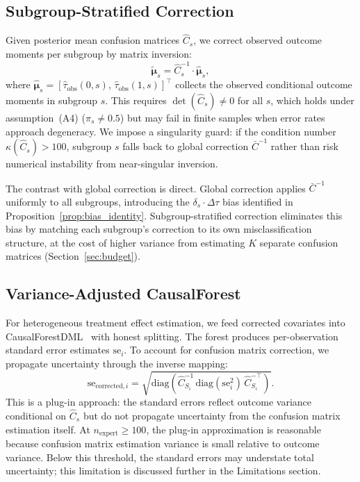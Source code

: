\subsection{Subgroup-Stratified Correction}

Given posterior mean confusion matrices $\hat{C}_s$, we correct observed outcome moments per subgroup by matrix inversion:
\begin{equation}
\tilde{\boldsymbol{\mu}}_s = \hat{C}_s^{-1} \cdot \hat{\boldsymbol{\mu}}_s,
\end{equation}
where $\hat{\boldsymbol{\mu}}_s = [\hat{\tau}_{\text{obs}}(0, s),\, \hat{\tau}_{\text{obs}}(1, s)]^\top$ collects the observed conditional outcome moments in subgroup $s$.
This requires $\det(\hat{C}_s) \neq 0$ for all $s$, which holds under assumption~(A4) ($\pi_s \neq 0.5$) but may fail in finite samples when error rates approach degeneracy.
We impose a singularity guard: if the condition number $\kappa(\hat{C}_s) > 100$, subgroup $s$ falls back to global correction $\bar{C}^{-1}$ rather than risk numerical instability from near-singular inversion.

The contrast with global correction is direct.
Global correction applies $\bar{C}^{-1}$ uniformly to all subgroups, introducing the $\delta_s \cdot \Delta\tau$ bias identified in Proposition~\ref{prop:bias_identity}.
Subgroup-stratified correction eliminates this bias by matching each subgroup's correction to its own misclassification structure, at the cost of higher variance from estimating $K$ separate confusion matrices (Section~\ref{sec:budget}).

\subsection{Variance-Adjusted CausalForest}

For heterogeneous treatment effect estimation, we feed corrected covariates into CausalForestDML~\cite{wager2018causal} with honest splitting.
The forest produces per-observation standard error estimates $\text{se}_i$.
To account for confusion matrix correction, we propagate uncertainty through the inverse mapping:
\begin{equation}
\text{se}_{\text{corrected},i} = \sqrt{\text{diag}\!\left(\hat{C}_{S_i}^{-1}\, \text{diag}(\text{se}_i^2)\, \hat{C}_{S_i}^{-\top}\right)}.
\end{equation}
This is a plug-in approach: the standard errors reflect outcome variance conditional on $\hat{C}_s$ but do not propagate uncertainty from the confusion matrix estimation itself.
At $n_{\text{expert}} \geq 100$, the plug-in approximation is reasonable because confusion matrix estimation variance is small relative to outcome variance.
Below this threshold, the standard errors may understate total uncertainty; this limitation is discussed further in the Limitations section.

